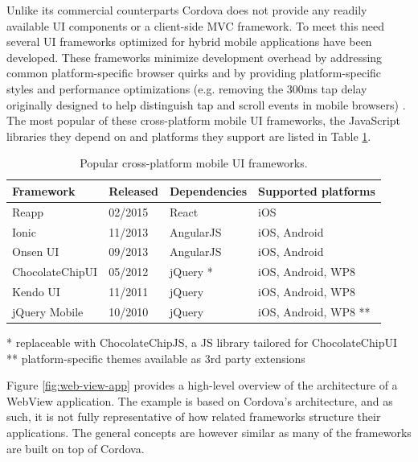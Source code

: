 \documentclass[thesis.tex]{subfiles}
\begin{document}
Unlike its commercial counterparts Cordova does not provide any readily available UI components or a client-side MVC framework. To meet this need several UI frameworks optimized for hybrid mobile applications have been developed. These frameworks minimize development overhead by addressing common platform-specific browser quirks and by providing platform-specific styles and performance optimizations (e.g. removing the 300ms tap delay originally designed to help distinguish tap and scroll events in mobile browsers) \cite{click_delay}. The most popular of these cross-platform mobile UI frameworks, the JavaScript libraries they depend on and platforms they support are listed in Table \ref{table:cross-platform-mobile-ui-frameworks}.

\begin{table}[hb]
	\caption{Popular cross-platform mobile UI frameworks.} \label{table:cross-platform-mobile-ui-frameworks}

	\begin{center}
	\begin{tabular}{| m{3.05cm} | m{1.75cm} | m{2.75cm} | m{4.25cm} |}

		\hline
		\textbf{Framework}	&	\textbf{Released}		&		\textbf{Dependencies}		&	\textbf{Supported platforms}		\\ \hline

		Reapp				&	02/2015						&	React						&	iOS 								\\ \hline
		Ionic				&	11/2013						&	AngularJS					&	iOS, Android						\\ \hline
		Onsen UI			&	09/2013						&	AngularJS					&	iOS, Android						\\ \hline
		ChocolateChipUI 	&	05/2012						&	jQuery \footnotesize{*}		&	iOS, Android, WP8					\\ \hline
		Kendo UI			&	11/2011						&	jQuery						&	iOS, Android, WP8					\\ \hline
		jQuery Mobile 		&	10/2010						&	jQuery						&	iOS, Android, WP8 \footnotesize{**}	\\ \hline

	\end{tabular}
	\end{center}
	\scriptsize{*} \small{replaceable with ChocolateChipJS, a JS library tailored for ChocolateChipUI}\\
	\scriptsize{**} \small{platform-specific themes available as 3rd party extensions}
\end{table}

Figure \ref{fig:web-view-app} provides a high-level overview of the architecture of a Web\-View application. The example is based on Cordova's architecture, and as such, it is not fully representative of how related frameworks structure their applications. The general concepts are however similar as many of the frameworks are built on top of Cordova.
\end{document}
